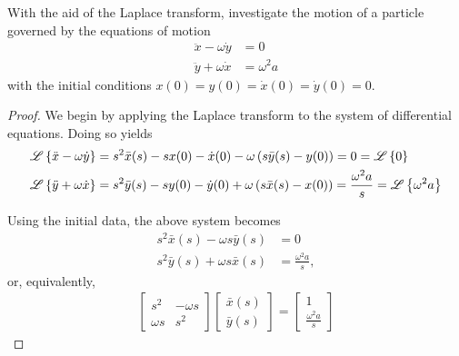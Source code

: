 \begin{problem}{4.14}
  With the aid of the Laplace transform, investigate the motion of a particle governed by
  the equations of motion
  \begin{align*}
    \ddot{x} - \omega \dot{y} &= 0 \\
    \ddot{y} + \omega \dot{x} &= \omega^2 a
  \end{align*}
  with the initial conditions $x(0) = y(0) = \dot{x}(0) = \dot{y}(0) = 0$.
\end{problem}

\begin{proof}
  We begin by applying the Laplace transform to the system of differential equations. Doing so
  yields
  \begin{align*}
    \mathscr{L}\left\{ {\ddot{x} - \omega \dot{y}} \right\} &= s^2\bar{x}(s) - sx(0) - \dot{x}(0) - \omega \left(s \bar{y}(s) - y(0)\right) = 0 = \mathscr{L}\left\{ {0} \right\} \\
    \mathscr{L}\left\{ {\ddot{y} + \omega \dot{x}} \right\} &= s^2 \bar{y}(s) -sy(0) - \dot{y}(0) + \omega \left(s \bar{x}(s) - x(0)\right) = \frac{\omega^2 a}{s} = \mathscr{L}\left\{ {\omega^2 a} \right\}
  \end{align*}

  Using the initial data, the above system becomes
  \begin{align*}
    s^2\bar{x}(s) - \omega s \bar{y}(s) &= 0 \\
    s^2 \bar{y}(s) + \omega s \bar{x}(s)&= \frac{\omega^2 a}{s},
  \end{align*}
  or, equivalently,
  \begin{align*}
    \begin{bmatrix}
      s^2 & -\omega s \\
      \omega s & s^2
    \end{bmatrix}
    \begin{bmatrix}
      \bar{x}(s) \\
      \bar{y}(s)
    \end{bmatrix}
    =
    \begin{bmatrix}
      1 \\
      \frac{\omega^2 a}{s}
    \end{bmatrix}
  \end{align*}


\end{proof}
